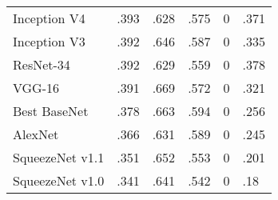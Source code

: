 \begin{tabular}{llllll}
        Inception V4 &           .393 &           .628 &           .575 &             0 &           .371 \\
        Inception V3 &           .392 &           .646 &           .587 &             0 &           .335 \\
           ResNet-34 &           .392 &           .629 &           .559 &             0 &           .378 \\
              VGG-16 &           .391 &           .669 &           .572 &             0 &           .321 \\
        Best BaseNet &           .378 &           .663 &           .594 &             0 &           .256 \\
             AlexNet &           .366 &           .631 &           .589 &             0 &           .245 \\
     SqueezeNet v1.1 &           .351 &           .652 &           .553 &             0 &           .201 \\
     SqueezeNet v1.0 &           .341 &           .641 &           .542 &             0 &            .18 \\
\bottomrule
\end{tabular}
